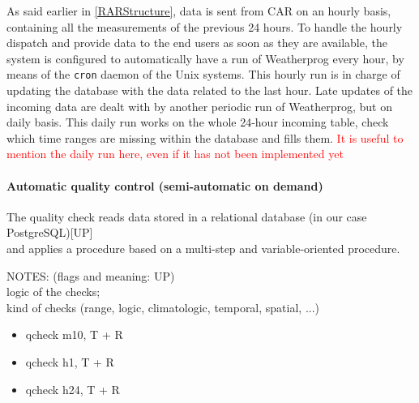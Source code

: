 \documentclass[authoryear,preprint,review,12pt]{elsarticle}
\begin{document}
As said earlier in \cref{RARStructure}, data is sent from CAR on an hourly basis,  containing all the measurements of the previous 24 hours. To handle the hourly dispatch and provide data to the end users as soon as they are available, the system is configured to automatically have a run of Weatherprog every hour, by means of the \texttt{cron} daemon of the Unix systems. This hourly run is in charge of updating the database with the data related to the last hour. Late updates of the incoming data are dealt with by another periodic run of Weatherprog, but on daily basis. This daily run works on the whole 24-hour incoming table, check which time ranges are missing within the database and fills them. \textcolor{Red}{It is useful to mention the daily run here, even if it has not been implemented yet}

\paragraph{Automatic quality control (semi-automatic on demand)}
The quality check reads data stored in a relational database (in our case PostgreSQL)[UP]\\
and applies a procedure based on a multi-step and variable-oriented procedure.

NOTES: (flags and meaning: UP)\\
logic of the checks;\\
kind of checks (range, logic, climatologic, temporal, spatial, ...)

\begin{itemize}
    \item qcheck m10, T + R
    \item qcheck h1,  T + R
    \item qcheck h24, T + R
\end{itemize}
\end{document}
